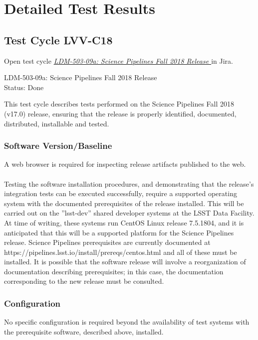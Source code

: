 \documentclass[DM,lsstdraft,STR,toc]{lsstdoc}
\begin{document}
\newpage
\section{Detailed Test Results}
\label{sect:detailedtestresults}


  \subsection{Test Cycle LVV-C18 }

Open test cycle {\it \href{https://jira.lsstcorp.org/secure/Tests.jspa#/testrun/LVV-C18}{LDM-503-09a: Science Pipelines Fall 2018 Release
}} in Jira.

  LDM-503-09a: Science Pipelines Fall 2018 Release
\\
  Status: Done

  This test cycle describes tests performed on the Science Pipelines Fall
2018 (v17.0) release, ensuring that the release is properly identified,
documented, distributed, installable and tested.


  \subsubsection{Software Version/Baseline}
    A web browser is required for inspecting release artifacts published to
the web.\\
~\\
Testing the software installation procedures, and demonstrating that the
release's integration tests can be executed successfully, require a
supported operating system with the documented prerequisites of the
release installed. This will be carried out on the ''lsst-dev'' shared
developer systems at the LSST Data Facility. At time of writing, these
systems run CentOS Linux release 7.5.1804, and it is anticipated that
this will be a supported platform for the Science Pipelines release.
Science Pipelines prerequisites are currently documented at
https://pipelines.lsst.io/install/prereqs/centos.html and all of these
must be installed. It is possible that the software release will involve
a reorganization of documentation describing prerequisites; in this
case, the documentation corresponding to the new release must be
consulted.


  \subsubsection{Configuration}
    No specific configuration is required beyond the availability of test
systems with the prerequisite software, described above, installed.
\end{document}
